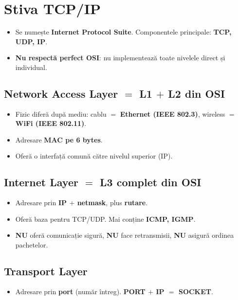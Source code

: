 \documentclass[11pt,a4paper]{article}
\begin{document}
\section{Stiva TCP/IP}
\begin{itemize}
  \item Se numește \textbf{Internet Protocol Suite}. Componentele principale: \textbf{TCP, UDP, IP}.
  \item \textbf{Nu respectă perfect OSI}: nu implementează toate nivelele direct și individual.
\end{itemize}


\subsection*{Network Access Layer $=$ L1 $+$ L2 din OSI}
\begin{itemize}
  \item Fizic diferă după mediu: cablu $=$ \textbf{Ethernet (IEEE 802.3)}, wireless $=$ \textbf{WiFi (IEEE 802.11)}.
  \item Adresare \textbf{MAC pe 6 bytes}.
  \item Oferă o interfață comună către nivelul superior (IP).
\end{itemize}

\subsection*{Internet Layer $=$ L3 complet din OSI}
\begin{itemize}
  \item Adresare prin \textbf{IP $+$ netmask}, plus \textbf{rutare}.
  \item Oferă baza pentru TCP/UDP. Mai conține \textbf{ICMP, IGMP}.
  \item \textbf{NU} oferă comunicație sigură, \textbf{NU} face retransmisii, \textbf{NU} asigură ordinea pachetelor.
\end{itemize}

\subsection*{Transport Layer}
\begin{itemize}
  \item Adresare prin \textbf{port} (număr întreg). \textbf{PORT $+$ IP $=$ SOCKET}.
\end{itemize}
\end{document}
